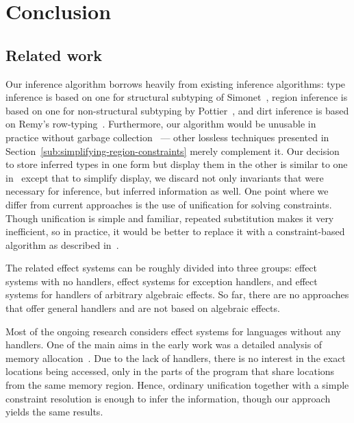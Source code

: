 \documentclass{LMCS}
\begin{document}
\section*{Conclusion}

\subsection*{Related work}

Our inference algorithm borrows heavily from existing inference algorithms:
type inference is based on one for structural subtyping of Simonet~\cite{simonet2003type},
region inference is based on one for non-structural subtyping by Pottier~\cite{pottier1998type},
and dirt inference is based on Remy's row-typing~\cite{remy1993type}.
Furthermore, our algorithm would be unusable in practice without garbage collection~\cite{pottier2001simplifying, simonet2003type, trifonov1996subtyping} ---
other lossless techniques presented in Section~\ref{sub:simplifying-region-constraints} merely complement it.
Our decision to store inferred types in one form but display them in the other is similar to one in~\cite{pottier1998type}
except that to simplify display, we discard not only invariants that were necessary for inference, but inferred information as well.
One point where we differ from current approaches is the use of unification for solving constraints.
Though unification is simple and familiar,
repeated substitution makes it very inefficient,
so in practice, it would be better to replace it with a constraint-based algorithm as described in~\cite{simonet2003type}.

The related effect systems can be roughly divided into three groups:
  effect systems with no handlers,
  effect systems for exception handlers,
  and effect systems for handlers of arbitrary algebraic effects.
So far, there are no approaches that offer general handlers and are not based on algebraic effects.

Most of the ongoing research considers effect systems for languages without any handlers.
One of the main aims in the early work was
a detailed analysis of memory allocation~\cite{lucassen1988polymorphic,talpin1992type,wadler1999marriage}.
Due to the lack of handlers, there is no interest in the exact locations being accessed,
only in the parts of the program that share locations from the same memory region.
Hence, ordinary unification together with a simple constraint resolution is enough to infer the information,
though our approach yields the same results.
\end{document}
